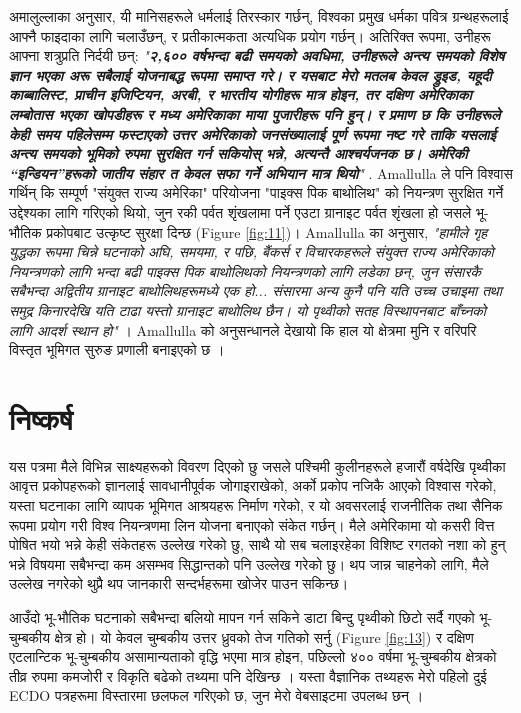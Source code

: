 \documentclass[10pt,twocolumn,letterpaper]{article}
\begin{document}
अमालुल्लाका अनुसार, यी मानिसहरूले धर्मलाई तिरस्कार गर्छन्, विश्वका प्रमुख धर्मका पवित्र ग्रन्थहरूलाई आफ्नै फाइदाका लागि चलाउँछन्, र प्रतीकात्मकता अत्यधिक प्रयोग गर्छन्। अतिरिक्त रूपमा, उनीहरू आफ्ना शत्रुप्रति निर्दयी छन्: \textit{"\textbf{२,६०० वर्षभन्दा बढी समयको अवधिमा, उनीहरूले अन्त्य समयको विशेष ज्ञान भएका अरू सबैलाई योजनाबद्ध रूपमा समाप्त गरे। र यसबाट मेरो मतलब केवल ड्रुइड, यहूदी काब्बालिस्ट, प्राचीन इजिप्टियन, अरबी, र भारतीय योगीहरू मात्र होइन, तर दक्षिण अमेरिकाका लम्बोतास भएका खोपडीहरू र मध्य अमेरिकाका माया पुजारीहरू पनि हुन्। र प्रमाण छ कि उनीहरूले केही समय पहिलेसम्म फस्टाएको उत्तर अमेरिकाको जनसंख्यालाई पूर्ण रूपमा नष्ट गरे ताकि यसलाई अन्त्य समयको भूमिको रुपमा सुरक्षित गर्न सकियोस् भन्ने, अत्यन्तै आश्चर्यजनक छ। अमेरिकी “इन्डियन”हरूको जातीय संहार त केवल सफा गर्ने अभियान मात्र थियो}"} \cite{33,34}.
Amallulla ले पनि विश्वास गर्थिन् कि सम्पूर्ण "संयुक्त राज्य अमेरिका" परियोजना "पाइक्स पिक बाथोलिथ" को नियन्त्रण सुरक्षित गर्ने उद्देश्यका लागि गरिएको थियो, जुन रकी पर्वत शृंखलामा पर्ने एउटा ग्रानाइट पर्वत शृंखला हो जसले भू-भौतिक प्रकोपबाट उत्कृष्ट सुरक्षा दिन्छ (Figure \ref{fig:11})। Amallulla का अनुसार, \textit{"हामीले गृह युद्धका रूपमा चिन्ने घटनाको अघि, समयमा, र पछि, बैंकर्स र विचारकहरूले संयुक्त राज्य अमेरिकाको नियन्त्रणको लागि भन्दा बढी पाइक्स पिक बाथोलिथको नियन्त्रणको लागि लडेका छन्, जुन संसारकै सबैभन्दा अद्वितीय ग्रानाइट बाथोलिथहरूमध्ये एक हो... संसारमा अन्य कुनै पनि यति उच्च उचाइमा तथा समुद्र किनारदेखि यति टाढा यस्तो ग्रानाइट बाथोलिथ छैन। यो पृथ्वीको सतह विस्थापनबाट बाँच्नको लागि आदर्श स्थान हो"} \cite{33,34}। Amallulla को अनुसन्धानले देखायो कि हाल यो क्षेत्रमा मुनि र वरिपरि विस्तृत भूमिगत सुरुङ प्रणाली बनाइएको छ \cite{36}।

\section{निष्कर्ष}

यस पत्रमा मैले विभिन्न साक्ष्यहरूको विवरण दिएको छु जसले पश्चिमी कुलीनहरूले हजारौं वर्षदेखि पृथ्वीका आवृत्त प्रकोपहरूको ज्ञानलाई सावधानीपूर्वक जोगाइराखेको, अर्को प्रकोप नजिकै आएको विश्वास गरेको, यस्ता घटनाका लागि व्यापक भूमिगत आश्रयहरू निर्माण गरेको, र यो अवसरलाई राजनीतिक तथा सैनिक रूपमा प्रयोग गरी विश्व नियन्त्रणमा लिन योजना बनाएको संकेत गर्छन्। मैले अमेरिकामा यो कसरी वित्त पोषित भयो भन्ने केही संकेतहरू उल्लेख गरेको छु, साथै यो सब चलाइरहेका विशिष्ट रगतको नशा को हुन् भन्ने विषयमा सबैभन्दा कम असम्भव सिद्धान्तको पनि उल्लेख गरेको छु। थप जान्न चाहनेको लागि, मैले उल्लेख नगरेको थुप्रै थप जानकारी सन्दर्भहरूमा खोजेर पाउन सकिन्छ।

आउँदो भू-भौतिक घटनाको सबैभन्दा बलियो मापन गर्न सकिने डाटा बिन्दु पृथ्वीको छिटो सर्दै गएको भू-चुम्बकीय क्षेत्र हो। यो केवल चुम्बकीय उत्तर ध्रुवको तेज गतिको सर्नु (Figure \ref{fig:13}) र दक्षिण एटलान्टिक भू-चुम्बकीय असामान्यताको वृद्धि भएमा मात्र होइन, पछिल्लो ४०० वर्षमा भू-चुम्बकीय क्षेत्रको तीव्र रुपमा कमजोरी र विकृति बढेको तथ्यमा पनि देखिन्छ \cite{3}। यस्ता वैज्ञानिक तथ्यहरू मेरो पहिलो दुई ECDO पत्रहरूमा विस्तारमा छलफल गरिएको छ, जुन मेरो वेबसाइटमा उपलब्ध छन् \cite{3}।
\end{document}
